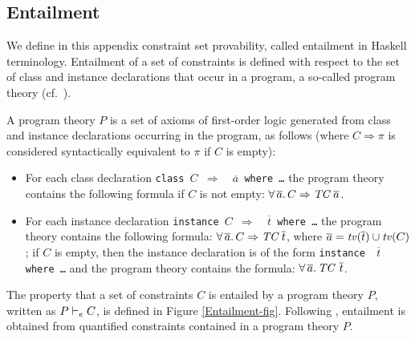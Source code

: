\subsection{Entailment}
\label{sec:entailment}

We define in this appendix constraint set provability, called
entailment in Haskell terminology. Entailment of a set of constraints
is defined with respect to the set of class and instance declarations
that occur in a program, a so-called program theory
(cf.~\cite{Understanding-FDs-via-CHRs}).

\begin{Definition}

A program theory $P$ is a set of axioms of first-order logic generated
from class and instance declarations occurring in the program, as
follows (where $C \Rightarrow \pi$ is considered syntactically
equivalent to $\pi$ if $C$ is empty):

\begin{itemize}

\item For each class declaration {\tt {class $C$ $\Rightarrow$ \TCC\ $\overline{a}$ where \ldots}}
the program theory contains the following formula if $C$ is not empty:
    $\forall\,\overline{a}.\,C \Rightarrow \mbox{\it TC}\ \overline{a}$.

\item For each instance declaration {\tt {instance $C$ $\Rightarrow$ \TCC\ $\overline{t}$ where \ldots}}
the program theory contains the following formula:
  $\forall\,\overline{a}.\,C \Rightarrow \TCC\ \overline{t}$, 
where \linebreak $\overline{a} = {\it tv\/}(\overline{t}) \cup {\it tv\/}(C)$;
if $C$ is empty, then the instance declaration is of the form 
  {\tt {instance \TCC\ $\overline{t}$ where \ldots}}
and the program theory contains the formula:
  $\forall\,\overline{a}.\,\mbox{\it TC}\:\: \overline{t}$.
\end{itemize}
\label{program-theory-def}
\end{Definition}

\vspace*{-.5\baselineskip}
The property that a set of constraints $C$ is entailed by a program
theory $P$, written as $P \vdash_e C$, is defined in Figure
\ref{Entailment-fig}.  Following
\cite{Associated-types-with-class,Associated-type-synonyms},
entailment is obtained from quantified constraints contained in a program
theory $P$.



